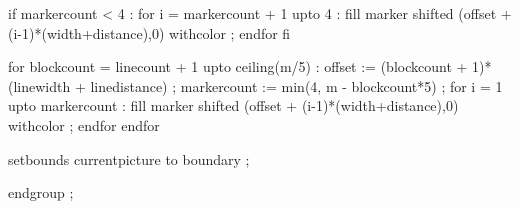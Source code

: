   if markercount < 4 :
    for i = markercount + 1 upto 4 : 
        fill marker shifted (offset + (i-1)*(width+distance),0)
        withcolor 
             ;
    endfor
  fi

  for blockcount = linecount + 1 upto ceiling(m/5) :
    offset := (blockcount + 1)*(linewidth + linedistance) ;
    markercount := min(4, m - blockcount*5) ;
    for i = 1 upto markercount :
      fill marker shifted (offset + (i-1)*(width+distance),0)
        withcolor 
             ;
    endfor
  endfor

  setbounds currentpicture to boundary ;

  endgroup ;

\stopuseMPgraphic


\protect


